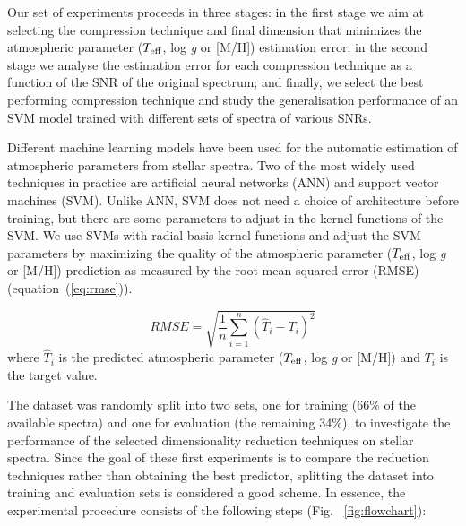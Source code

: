 \documentclass[a4paper,fleqn,usenatbib]{mnras}
\begin{document}
Our set of experiments proceeds in three stages: in the first stage we
aim at selecting the compression technique and final dimension that
minimizes the atmospheric parameter ($T_{\rm eff}$, log \textit{g} or
[M/H]) estimation error; in the second stage we analyse the estimation
error for each compression technique as a function of the SNR of the
original spectrum; and finally, we select the best performing
compression technique and study the generalisation performance of an
SVM model trained with different sets of spectra of various SNRs.

Different machine learning models have been used for the automatic
estimation of atmospheric parameters from stellar spectra. Two of the
most widely used techniques in practice are artificial neural networks
(ANN) and support vector machines (SVM). Unlike ANN, SVM does not need
a choice of architecture before training, but there are some
parameters to adjust in the kernel functions of the SVM. We use SVMs
with radial basis kernel functions and adjust the SVM parameters by
maximizing the quality of the atmospheric parameter ($T_{\rm eff}$,
log \textit{g} or [M/H]) prediction as measured by the root mean
squared error (RMSE) (equation~(\ref{eq:rmse})).

\begin{equation}
\label{eq:rmse}
RMSE=\sqrt{\frac{1}{n}\sum_{i=1}^{n}\left(\hat{T}_{i}-T_{i}\right)^{2}}
\end{equation}
where $\hat{T}_{i}$ is the predicted atmospheric parameter ($T_{\rm eff}$, 
  log \textit{g} or [M/H]) and $T_{i}$ is the target value. 
  
The dataset was randomly split into two sets, one for training
  (66\% of the available spectra) and one for evaluation (the
  remaining 34\%), to investigate the performance of the selected
  dimensionality reduction techniques on stellar spectra. Since the
goal of these first experiments is to compare the reduction techniques
rather than obtaining the best predictor, splitting the dataset into
training and evaluation sets is considered a good scheme. In essence,
the experimental procedure consists of the following steps (Fig.~
\ref{fig:flowchart}):
\end{document}

